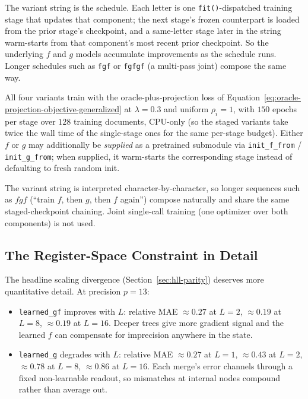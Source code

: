 The variant string is the schedule. Each letter is one
\texttt{fit()}-dispatched training stage that updates that component;
the next stage's frozen counterpart is loaded from the prior stage's
checkpoint, and a same-letter stage later in the string warm-starts
from that component's most recent prior checkpoint. So the underlying
$f$ and $g$ models accumulate improvements as the schedule runs.
Longer schedules such as \texttt{fgf} or \texttt{fgfgf} (a multi-pass
joint) compose the same way.

All four variants train with the oracle-plus-projection loss of
Equation~\eqref{eq:oracle-projection-objective-generalized} at
$\lambda = 0.3$ and uniform $\rho_i = 1$, with $150$ epochs per stage
over $128$ training documents, CPU-only (so the staged variants take
twice the wall time of the single-stage ones for the same per-stage
budget). Either $f$ or $g$ may additionally be \emph{supplied} as a
pretrained submodule via \texttt{init\_f\_from} / \texttt{init\_g\_from};
when supplied, it warm-starts the corresponding stage instead of
defaulting to fresh random init.

The variant string is interpreted character-by-character, so longer
sequences such as $fgf$ (``train $f$, then $g$, then $f$ again'') compose
naturally and share the same staged-checkpoint chaining. Joint
single-call training (one optimizer over both components) is not used.

\subsection{The Register-Space Constraint in Detail}

The headline scaling divergence (Section~\ref{sec:hll-parity}) deserves
more quantitative detail. At precision $p = 13$:

\begin{itemize}
\item \texttt{learned\_gf} improves with $L$: relative MAE $\approx 0.27$ at $L=2$, $\approx 0.19$ at $L=8$, $\approx 0.19$ at $L=16$. Deeper trees give more gradient signal and the learned $f$ can compensate for imprecision anywhere in the state.
\item \texttt{learned\_g} degrades with $L$: relative MAE $\approx 0.27$ at $L=1$, $\approx 0.43$ at $L=2$, $\approx 0.78$ at $L=8$, $\approx 0.86$ at $L=16$. Each merge's error channels through a fixed non-learnable readout, so mismatches at internal nodes compound rather than average out.
\end{itemize}

